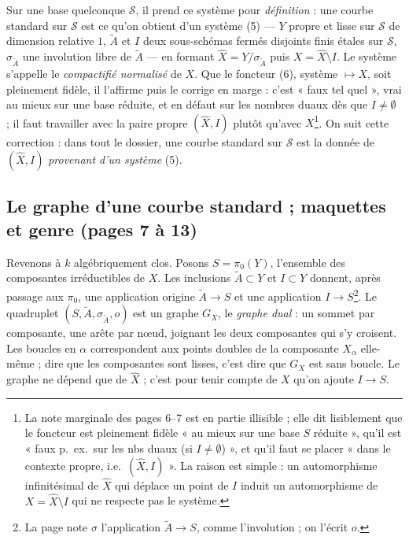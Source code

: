 \documentclass[11pt,a4paper]{article}
\begin{document}
Sur une base quelconque $\mathcal{S}$, il prend ce système pour
\emph{définition} : une courbe standard sur $\mathcal{S}$ est ce qu'on obtient
d'un système (5) — $Y$ propre et lisse sur $\mathcal{S}$ de dimension relative
$1$, $\widetilde{A}$ et $I$ deux sous-schémas fermés disjoints finis étales sur
$\mathcal{S}$, $\sigma_{\widetilde{A}}$ une involution libre de $\widetilde{A}$ —
en formant $\widehat{X} = Y/\sigma_{\widetilde{A}}$ puis $X = \widehat{X}
\setminus I$. Le système s'appelle le \emph{compactifié normalisé} de $X$. Que le
foncteur (6), système $\mapsto X$, soit pleinement fidèle, il l'affirme puis le
corrige en marge : c'est « faux tel quel », vrai au mieux sur une base réduite,
et en défaut sur les nombres duaux dès que $I \neq \emptyset$ ; il faut
travailler avec la paire propre $(\widehat{X}, I)$ plutôt qu'avec
$X$\footnote{La note marginale des pages 6--7 est en partie illisible ; elle dit
lisiblement que le foncteur est pleinement fidèle « au mieux sur une base $S$
réduite », qu'il est « faux p.\ ex.\ sur les nbs duaux (si $I \neq \emptyset$) »,
et qu'il faut se placer « dans le contexte propre, i.e.\ $(\widehat{X}, I)$ ».
La raison est simple : un automorphisme infinitésimal de $\widehat{X}$ qui
déplace un point de $I$ induit un automorphisme de $X = \widehat{X} \setminus
I$ qui ne respecte pas le système.}. On suit cette correction : dans tout le
dossier, une courbe standard sur $\mathcal{S}$ est la donnée de $(\widehat{X},
I)$ \emph{provenant d'un système} (5).

\subsection*{Le graphe d'une courbe standard ; maquettes et genre (pages 7 à 13)}

Revenons à $k$ algébriquement clos. Posons $S = \pi_0(Y)$, l'ensemble des
composantes irréductibles de $X$. Les inclusions $\widetilde{A} \subset Y$ et $I
\subset Y$ donnent, après passage aux $\pi_0$, une application origine
$\widetilde{A} \to S$ et une application $I \to S$\footnote{La page note
$\sigma$ l'application $\widetilde{A} \to S$, comme l'involution ; on l'écrit
$o$.}. Le quadruplet $(S, \widetilde{A}, \sigma_{\widetilde{A}}, o)$ est un graphe
$G_X$, le \emph{graphe dual} : un sommet par composante, une arête par nœud,
joignant les deux composantes qui s'y croisent. Les boucles en $\alpha$
correspondent aux points doubles de la composante $X_\alpha$ elle-même ; dire que
les composantes sont lisses, c'est dire que $G_X$ est sans boucle. Le graphe ne
dépend que de $\widehat{X}$ ; c'est pour tenir compte de $X$ qu'on ajoute $I \to
S$.
\end{document}
